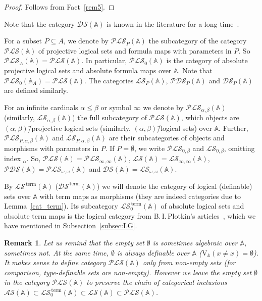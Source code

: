 \documentclass[12pt]{article}
\newtheorem{remark}{Remark}
\theoremstyle{definition}
\def\MA{{\mathbb{A}}}
\def\PLS{{\mathcal{PLS}}}
\def\PDS{{\mathcal{PDS}}}
\def\DS{{\mathcal{DS}}}
\def\LS{{\mathcal{LS}}}
\def\AS{{\mathcal{AS}}}
\def\term{{\,\mathrm{term}}}
\def\V{{\mathrm{V}}}
\begin{document}
\begin{proof}
    Follows from Fact~\ref{rem5}.
\end{proof}

Note that the category $\DS(\MA)$ is known in the literature for a long time~\cite{AhZ}. 

For a subset $P\subseteq A$, we denote by $\PLS_P(\MA)$ the subcategory of the category $\PLS(\MA)$ of projective logical sets and formula maps with parameters in $P$. So $\PLS_A(\MA)=\PLS(\MA)$. In particular, $\PLS_0(\MA)$ is the category of absolute projective logical sets and absolute formula maps over $\MA$. Note that $\PLS_0(\MA_A)=\PLS(\MA)$. 
The categories $\LS_P(\MA)$, $\PDS_P(\MA)$ and $\DS_P(\MA)$ are defined similarly.  

For an infinite cardinals $\alpha\leqslant\beta$ or symbol $\infty$ we denote by $\PLS_{\alpha,\beta}(\MA)$ (similarly, $\LS_{\alpha,\beta}(\MA)$) the full subcategory of $\PLS(\MA)$, which objects are $(\alpha,\beta)$\=/projective logical sets (similarly, $(\alpha,\beta)$\=/logical sets) over $\MA$. Further, $\PLS_{P,\alpha,\beta}(\MA)$ and $\LS_{P,\alpha,\beta}(\MA)$ are their subcategories of objects and morphisms with parameters in $P$. If $P=\emptyset$, we write $\PLS_{0,\beta}$ and $\LS_{0,\beta}$, omitting index $_\alpha$. So, $\PLS(\MA)=\PLS_{\infty,\infty}(\MA)$, $\LS(\MA)=\LS_{\infty,\infty}(\MA)$, $\PDS(\MA)=\PLS_{\omega,\omega}(\MA)$ and $\DS(\MA)=\LS_{\omega,\omega}(\MA)$.

By $\LS^\term(\MA)$ ($\DS^\term(\MA)$) we will denote the category of logical (definable) sets over $\MA$ with term maps as morphisms (they are indeed categories due to Lemma~\ref{cat_term}). Its subcategory $\LS_0^\term(\MA)$ of absolute logical sets and absolute term maps is the logical category from B.\,I.\,Plotkin's articles~\cite{Plotkin6, Plotkin10, Plotkin5}, which we have mentioned in Subsection~\ref{subsec:LG}.

\begin{remark}\label{remark_emptyset}
Let us remind that the empty set $\emptyset$ is sometimes algebraic over $\MA$, sometimes not. At the same time, $\emptyset$ is always definable over $\MA$ ($\V_\MA(x\ne x)=\emptyset$). It makes sense to define category  $\PLS(\MA)$ only from non-empty sets (for comparison, type-definable sets are non-empty). However we leave the empty set $\emptyset$ in the category $\PLS(\MA)$ to preserve the chain of categorical inclusions $\AS(\MA)\subset \LS^\term_0(\MA)\subset \LS(\MA)\subset \PLS(\MA)$.
\end{remark}
\end{document}
